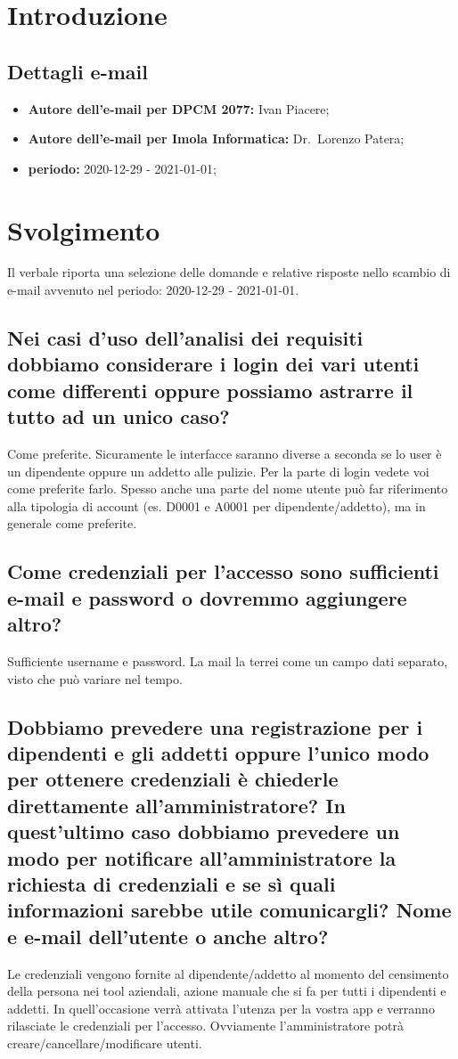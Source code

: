 \section*{Introduzione}
\subsection*{Dettagli e-mail}
\begin{itemize}
	\item \textbf{Autore dell'e-mail per DPCM 2077:} Ivan Piacere;
	\item \textbf{Autore dell'e-mail per Imola Informatica:} Dr.~Lorenzo Patera;
	\item \textbf{periodo:} 2020-12-29 - 2021-01-01;
\end{itemize}

\section*{Svolgimento}
Il verbale riporta una selezione delle domande e relative risposte nello scambio di e-mail avvenuto nel periodo: 2020-12-29 - 2021-01-01.
\subsection*{Nei casi d'uso dell'analisi dei requisiti dobbiamo considerare i login dei vari utenti come differenti oppure possiamo astrarre il tutto ad un unico caso?}
Come preferite. Sicuramente le interfacce saranno diverse a seconda se lo user è un dipendente oppure un addetto alle pulizie. Per la parte di login vedete voi come preferite farlo. Spesso anche una parte del nome utente può far riferimento alla tipologia di account (es. D0001 e A0001 per dipendente/addetto), ma in generale come preferite.
\subsection*{Come credenziali per l'accesso sono sufficienti e-mail e password o dovremmo aggiungere altro?}
Sufficiente username e password. La mail la terrei come un campo dati separato, visto che può variare nel tempo.
\subsection*{Dobbiamo prevedere una registrazione per i dipendenti e gli addetti oppure l'unico modo per ottenere credenziali è chiederle direttamente all'amministratore? In quest'ultimo caso dobbiamo prevedere un modo per notificare all'amministratore la richiesta di credenziali e se sì quali informazioni sarebbe utile comunicargli? Nome e e-mail dell'utente o anche altro?}
Le credenziali vengono fornite al dipendente/addetto al momento del censimento della persona nei tool aziendali, azione manuale che si fa per tutti i dipendenti e addetti. In quell'occasione verrà attivata l'utenza per la vostra app e verranno rilasciate le credenziali per l'accesso. Ovviamente l'amministratore potrà creare/cancellare/modificare utenti.
